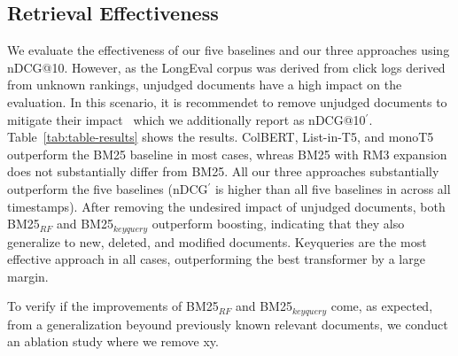 \subsection{Retrieval Effectiveness}




We evaluate the effectiveness of our five baselines and our three approaches using nDCG@10. However, as the LongEval corpus was derived from click logs derived from unknown rankings, unjudged documents have a high impact on the evaluation. In this scenario, it is recommendet to remove unjudged documents to mitigate their impact~\cite{sakai:2007} which we additionally report as nDCG@10$^{'}$. Table~\ref{tab:table-results} shows the results. ColBERT, List-in-T5, and monoT5 outperform the BM25 baseline in most cases, whreas BM25 with RM3 expansion does not substantially differ from BM25. All our three approaches substantially outperform the five baselines (nDCG$^{'}$ is higher than all five baselines in across all timestamps). After removing the undesired impact of unjudged documents, both BM25$_{RF}$ and BM25$_{keyquery}$ outperform boosting, indicating that they also generalize to new, deleted, and modified documents. Keyqueries are the most effective approach in all cases, outperforming the best transformer by a large margin.



To verify if the improvements of BM25$_{RF}$ and BM25$_{keyquery}$ come, as expected, from a generalization beyound previously known relevant documents, we conduct an ablation study where we remove xy.
